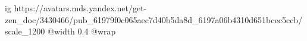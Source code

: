  
 
 
 
 

\ifcmt
  ig https://avatars.mds.yandex.net/get-zen_doc/3430466/pub_61979f0c065aec7d40b5da8d_6197a06b4310d651bcec5ccb/scale_1200
  @width 0.4
  @wrap 
\fi
